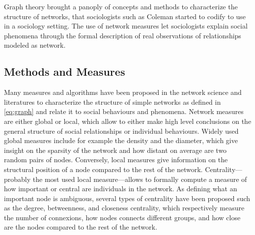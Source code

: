 Graph theory brought a panoply of concepts and methods to characterize the structure of  networks, that sociologists such as Coleman started to codify to use in a sociology setting\cite{colemanIntroductionMathematicalSociology1964}.
The use of network measures let sociologists explain social phenomena through the formal description of real observations of relationships modeled as network.


\subsection{Methods and Measures}\label{subsec:methods-and-measures}



Many measures and algorithms have been proposed in the network science and \sna literatures to characterize the structure of simple networks as defined in \autoref{eq:graph} and relate it to social behaviours and phenomena\cite{scottSocialNetworkAnalysis1988, tabassumSocialNetworkAnalysis2018}.
Network measures are either global or local, which allow to either make high level conclusions on the general structure of social relationships or individual behaviours.
Widely used global measures include for example the density and the diameter, which give insight on the sparsity of the network and how distant on average are two random pairs of nodes.
Conversely, local measures give information on the structural position of a node compared to the rest of the network.
Centrality---probably the most used local measure---allows to formally compute a measure of how important or central are individuals in the network\cite{newmanNetworks2018}.
As defining what an important node is ambiguous, several types of centrality have been proposed such as the degree, betweenness, and closeness centrality, which respectively measure the number of connexions, how nodes connects different groups, and how close are the nodes compared to the rest of the network.

